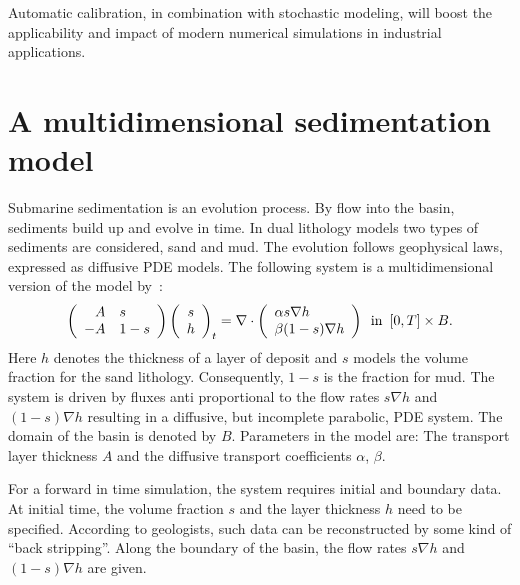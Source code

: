 Automatic calibration, in combination with stochastic modeling, will
boost the applicability and impact of modern numerical simulations in
industrial applications.

\section{A multidimensional sedimentation model}

Submarine sedimentation is an evolution process.  By flow into the
basin, sediments build up and evolve in time.  In dual lithology
models two types of sediments are considered, sand and mud.  The
evolution follows geophysical laws, expressed as diffusive PDE models.
The following system is a multidimensional version of the model
by~\citet{Rivenaes1992, Rivenaes1993}:
\begin{equation} \label{eq:schroll:model}
\left(\begin{array}{rl} A & s \\ -A & 1-s \end{array}\right)
\left(\begin{array}{c} s \\ h \end{array}\right)_t =
\nabla \cdot \left( \begin{array}{l} \alpha s \nabla h \\ \beta (1-s) \nabla h \end{array} \right)
\enspace \hbox{in} \enspace [0,T] \times B.
\end{equation}
Here $h$ denotes the thickness of a layer of deposit and $s$ models
the volume fraction for the sand lithology.  Consequently, $1-s$ is
the fraction for mud.  The system is driven by fluxes anti
proportional to the flow rates $s \nabla h$ and $(1-s) \nabla h$
resulting in a diffusive, but incomplete parabolic, PDE system.  The
domain of the basin is denoted by $B$.  Parameters in the model are:
The transport layer thickness $A$ and the diffusive transport
coefficients $\alpha$, $\beta$.

For a forward in time simulation, the system requires initial and
boundary data.  At initial time, the volume fraction $s$ and the layer
thickness $h$ need to be specified. According to geologists, such
data can be reconstructed by some kind of ``back stripping''.  Along
the boundary of the basin, the flow rates $s \nabla h$ and
$(1-s) \nabla h$ are given.

